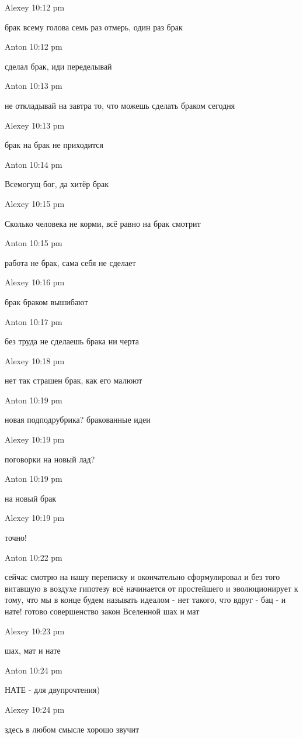 Alexey 10:12 pm

    брак всему голова
    семь раз отмерь, один раз брак

Anton 10:12 pm

    сделал брак, иди переделывай

Anton 10:13 pm

    не откладывай на завтра то, что можешь сделать браком сегодня

Alexey 10:13 pm

    брак на брак не приходится

Anton 10:14 pm

    Всемогущ бог, да хитёр брак

Alexey 10:15 pm

    Сколько человека не корми, всё равно на брак смотрит

Anton 10:15 pm

    работа не брак, сама себя не сделает

Alexey 10:16 pm

    брак браком вышибают

Anton 10:17 pm

    без труда не сделаешь брака ни черта

Alexey 10:18 pm

    нет так страшен брак, как его малюют

Anton 10:19 pm

    новая подподрубрика?
    бракованные идеи

Alexey 10:19 pm

    поговорки на новый лад?

Anton 10:19 pm

    на новый брак

Alexey 10:19 pm

    точно!

Anton 10:22 pm

    сейчас смотрю на нашу переписку и окончательно сформулировал и без того витавшую в воздухе гипотезу
    всё начинается от простейшего и эволюционирует к тому, что мы в конце будем называть идеалом - нет такого, что вдруг - бац - и нате! готово совершенство
    закон Вселенной
    шах и мат

Alexey 10:23 pm

    шах, мат и нате

Anton 10:24 pm

    НАТЕ - для двупрочтения)

Alexey 10:24 pm

    здесь в любом смысле хорошо звучит


